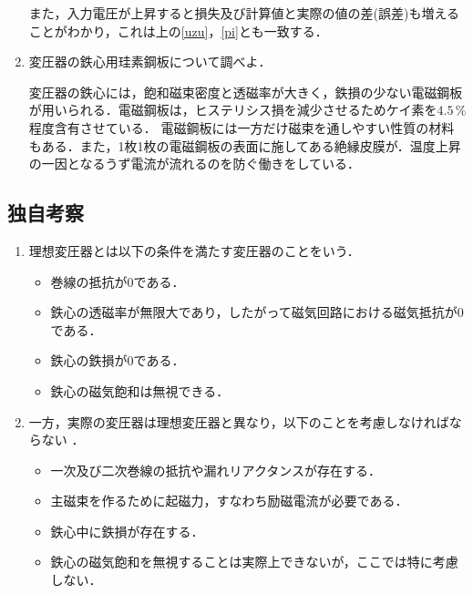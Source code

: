 \begin{enumerate}[1.]
	また，入力電圧が上昇すると損失及び計算値と実際の値の差(誤差)も増えることがわかり，これは上の\ref{uzu}，\ref{pi}とも一致する．
	\item 変圧器の鉄心用珪素鋼板について調べよ．\cite{1130282270091060}
	
	変圧器の鉄心には，飽和磁束密度と透磁率が大きく，鉄損の少ない電磁鋼板が用いられる．電磁鋼板は，ヒステリシス損を減少させるためケイ素を$4.5\,\%$程度含有させている．
	電磁鋼板には一方だけ磁束を通しやすい性質の材料もある．また，1枚1枚の電磁鋼板の表面に施してある絶縁皮膜が．温度上昇の一因となるうず電流が流れるのを防ぐ働きをしている．
\end{enumerate}

\subsection{独自考察}
\begin{enumerate}[1.]
	\item 理想変圧器とは以下の条件を満たす変圧器のことをいう\cite{1130000795154912128}．
\begin{itemize}
	\item 巻線の抵抗が0である．
	\item 鉄心の透磁率が無限大であり，したがって磁気回路における磁気抵抗が0である．
	\item 鉄心の鉄損が0である．
	\item 鉄心の磁気飽和は無視できる．
\end{itemize}
\item 一方，実際の変圧器は理想変圧器と異なり，以下のことを考慮しなければならない
\label{real}
\cite{1130154912128}．
\begin{itemize}
	\item 一次及び二次巻線の抵抗や漏れリアクタンスが存在する．
	\item 主磁束を作るために起磁力，すなわち励磁電流が必要である．
	\item 鉄心中に鉄損が存在する．
	\item 鉄心の磁気飽和を無視することは実際上できないが，ここでは特に考慮しない．
\end{itemize}
\end{enumerate}